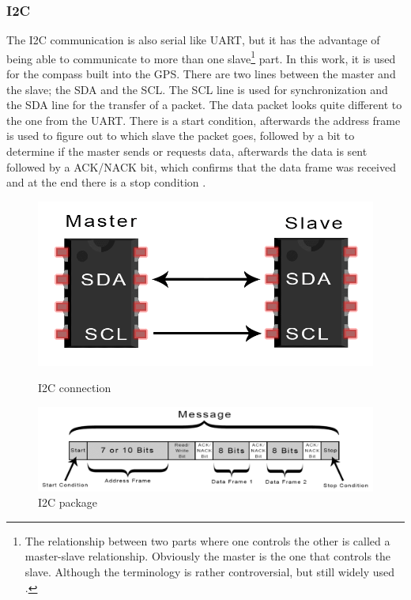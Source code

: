 \documentclass[svgnames]{article}
\begin{document}
	\subsubsection{I2C}
	The \gls{I2C} communication is also serial like \gls{UART}, but it has the advantage of being able to communicate to more than one slave\footnote{The relationship between two parts where one controls the other is called a master-slave relationship. Obviously the master is the one that controls the slave. Although the terminology is rather controversial, but still widely used \cite{masterslave}.} part. In this work, it is used for the compass built into the \gls{GPS}. There are two lines between the master and the slave; the \gls{SDA} and the \gls{SCL}. The \gls{SCL} line is used for synchronization and the \gls{SDA} line for the transfer of a packet. The data packet looks quite different to the one from the \gls{UART}. There is a start condition, afterwards the address frame is used to figure out to which slave the packet goes, followed by a bit to determine if the master sends or requests data, afterwards the data is sent followed by a ACK/NACK bit, which confirms that the data frame was received and at the end there is a stop condition \cite{i2cprotocol}.
\begin{figure}[ht]
	\begin{minipage}[c]{0.4\textwidth}
		\includegraphics[width=\textwidth]{pictures/I2Cconnection}
		\caption{\gls{I2C} connection \cite{i2cprotocol}}
		\label{fig:I2Cconnection}
	\end{minipage}
	\hfill
	\begin{minipage}[c]{0.4\textwidth}
		\includegraphics[width=\textwidth]{pictures/I2Cpackage}
		\caption{\gls{I2C} package \cite{i2cprotocol}}
		\label{fig:I2Cpackage}
	\end{minipage}
\end{figure}
\end{document}
